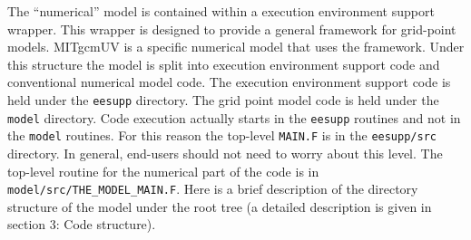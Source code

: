 The ``numerical'' model is contained within a execution environment
support wrapper. This wrapper is designed to provide a general
framework for grid-point models. MITgcmUV is a specific numerical
model that uses the framework. Under this structure the model is split
into execution environment support code and conventional numerical
model code. The execution environment support code is held under the
\texttt{eesupp} directory. The grid point model code is held under the
\texttt{model} directory. Code execution actually starts in the
\texttt{eesupp} routines and not in the \texttt{model} routines. For
this reason the top-level \texttt{MAIN.F} is in the
\texttt{eesupp/src} directory. In general, end-users should not need
to worry about this level. The top-level routine for the numerical
part of the code is in \texttt{model/src/THE\_MODEL\_MAIN.F}. Here is
a brief description of the directory structure of the model under the
root tree (a detailed description is given in section 3: Code
structure).

